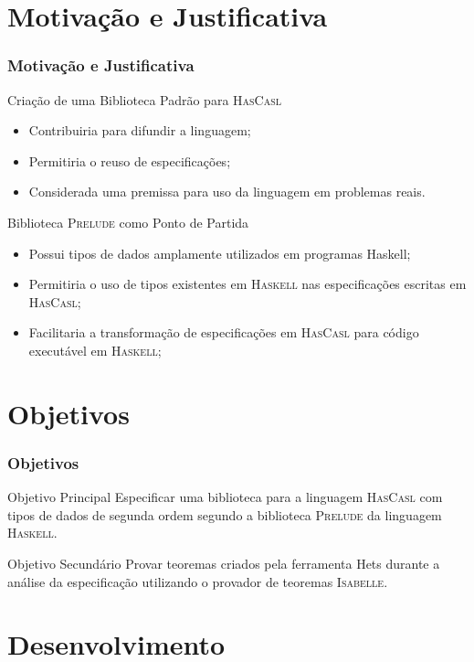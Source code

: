 \documentclass{beamer}
\newcommand{\HasCASL}{\textsc{HasCasl}\xspace}
\newcommand{\Haskell}{\textsc{Haskell}\xspace}
\newcommand{\Isabelle}{\textsc{Isabelle}\xspace}
\newcommand{\Prelude}{\textsc{Prelude}\xspace}
\begin{document}
\section{Motivação e Justificativa}

\begin{frame}
	\frametitle{Motivação e Justificativa}
	\begin{block}{Criação de uma Biblioteca Padrão para \HasCASL}
	\begin{itemize}
		\item Contribuiria para difundir a linguagem;
		\item Permitiria o reuso de especificações;
		\item Considerada uma premissa para uso da linguagem em problemas reais.
	\end{itemize}
	\end{block}
	\begin{block}{Biblioteca \Prelude como Ponto de Partida}
	\begin{itemize}
		\item Possui tipos de dados amplamente utilizados em programas Haskell;
		\item Permitiria o uso de tipos existentes em \Haskell nas especificações escritas em \HasCASL;
		\item Facilitaria a transformação de especificações em \HasCASL para código executável em \Haskell;
	\end{itemize}
	\end{block}
\end{frame}

\section{Objetivos}

\begin{frame}
	\frametitle{Objetivos}
	\begin{block}{Objetivo Principal}
		Especificar uma biblioteca para a linguagem \HasCASL com tipos de dados de segunda ordem segundo a biblioteca \Prelude da linguagem \Haskell.
	\end{block}
	\begin{block}{Objetivo Secundário}
		Provar teoremas criados pela ferramenta Hets durante a análise da especificação utilizando o provador de teoremas \Isabelle.
	\end{block}
\end{frame}

\section{Desenvolvimento}
\end{document}
